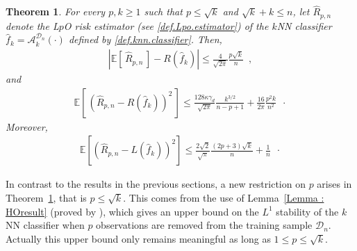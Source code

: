 \documentclass[twoside,11pt]{article}
\numberwithin{equation}{section}
\newcommand{\esp}[1]{\mathbb{E}\left[#1 \right]}
\newcommand{\1}{\mathds{1}}%
\newcommand{\paren}[1]{\left( #1 \right)}
\newcommand{\croch}[1]{\left[\, #1 \,\right]}
\newcommand{\abs}[1]{\left\lvert #1 \right\rvert} %
\newcommand{\Rh}{\widehat{R}}
\newcommand{\D}{\mathcal{D}}
\newcommand{\Dn}{\mathcal{D}_n}
\newcommand{\A}{\mathcal{A}}
\numberwithin{equation}{section}
\theoremstyle{plain}
\newtheorem{thm}{Theorem}[section]
\begin{document}
\begin{thm}\label{Prop : Consistency}
For every $ p,k\geq 1$ such that $p\leq \sqrt{k}$ and $ \sqrt{k}+k \leq n$, let $\Rh_{p,n}$ denote the L$p$O risk estimator (see \eqref{def.Lpo.estimator}) of the $k$NN classifier $\hat f_k=\A_k^{\Dn}(\cdot)$ defined by \eqref{def.knn.classifier}.
Then,
\begin{align}\label{Equ : BiasLpO}
\abs{\mathbb{E}\croch{ \Rh_{p,n} } -R(\hat{f}_k)  }  \leq  \frac{4}{\sqrt{2\pi}}\frac{p\sqrt{k}}{n}  \enspace ,
\end{align}
%
and
%
\begin{align}\label{eq.EQM.LpO}
\mathbb{E}\croch{ \paren{ \Rh_{p,n} - R(\hat{f}_k) }^2 }   \leq  \frac{128\kappa\gamma_d}{\sqrt{2\pi}} \frac{k^{3/2}}{n-p+1}+  \frac{16}{2\pi}\frac{p^2 k }{n^2} \enspace \cdot
\end{align}
%
Moreover,
%
\begin{eqnarray}\label{ineq.upper.bound.squared.deviation.moment}
\esp{\left(\Rh_{p,n}-L(\hat f_k)\right)^2} \leq \frac{2\sqrt{2}}{\sqrt{\pi}}\frac{(2p+3)\sqrt{k}}{n} + \frac{1}{n} \enspace\cdot
\end{eqnarray}
\end{thm}
%
In contrast to the results in the previous sections, a new restriction on $p$ arises in Theorem~\ref{Prop : Consistency}, that is $p\leq \sqrt{k}$.
%
This comes from the use of Lemma~\ref{Lemma : HOresult} (proved by \citet{DeWa79}), which gives an upper bound on the $L^1$ stability of the $k$NN classifier when $p$ observations are removed from the training sample $\D_n$.
Actually this upper bound only remains meaningful as long as $1\leq p\leq \sqrt{k}$.
%
\end{document}

